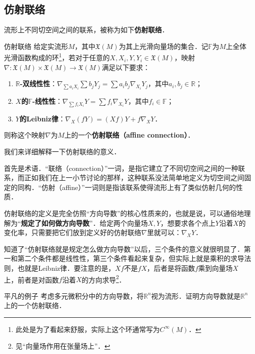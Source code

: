 \subsection{仿射联络}

流形上不同切空间之间的联系，被称为如下\textbf{仿射联络}．

\begin{definition}{仿射联络}
给定实流形$M$，其中$\mathfrak{X}(M)$为其上光滑向量场的集合．记$\mathbb{F}$为$M$上全体光滑函数构成的环\footnote{此处是为了看起来舒服，实际上这个环通常写为$C^\infty(M)$．}，若对于任意的$X, X_i, Y, Y_i\in\mathfrak{X}(M)$，映射$\nabla:\mathfrak{X}(M)\times\mathfrak{X}(M)\to\mathfrak{X}(M)$满足以下要求：
\begin{enumerate}
\item \textbf{$\mathbb{R}$-双线性性}：$\nabla_{\sum a_iX_i}\sum b_jY_j=\sum a_ib_j\nabla_{X_i}Y_j$，其中$a_i, b_j\in\mathbb{R}$；
\item \textbf{$X$的$\mathbb{F}$-线性性}：$\nabla_{\sum f_iX_i}Y=\sum f_i\nabla_{X_i}Y$，其中$f_i\in\mathbb{F}$；
\item \textbf{$Y$的Leibniz律}：$\nabla_X(fY)=(Xf)Y+f\nabla_XY$．
\end{enumerate}
则称这个映射$\nabla$为$M$上的一个\textbf{仿射联络（affine connection）}．
\end{definition}

我们来详细解释一下仿射联络的意义．

首先是术语．“联络（connection）”一词，是指它建立了不同切空间之间的一种联系，而正如我们在上一小节讨论的那样，这种联系没法简单地定义为切空间之间固定的同构．“仿射（affine）”一词则是指该联系使得流形上有了类似仿射几何的性质．

仿射联络的定义是完全仿照“方向导数”的核心性质来的，也就是说，可以通俗地理解为“\textbf{规定了如何做方向导数}”．给定两个向量场$X, Y$，想要求各个点上$Y$沿着$X$的变化率，只需要把它们放到定义好的仿射联络$\nabla$里就可以：$\nabla_XY$．

知道了“仿射联络就是规定怎么做方向导数”以后，三个条件的意义就很明显了．第一和第二个条件都是线性性，第三个条件看起来复杂，但实际上就是乘积的求导法则，也就是Leibniz律．要注意的是，$Xf$不是$fX$，后者是将函数$f$乘到向量场$X$上，前者是对函数$f$沿着$X$的方向求导\footnote{见“向量场作用在张量场上”．}．

\begin{exercise}{平凡的例子}
考虑多元微积分中的方向导数，将$\mathbb{R}^n$视为流形．证明方向导数就是$\mathbb{R}^n$上的一个仿射联络．
\end{exercise}

